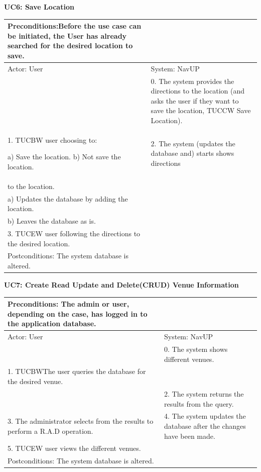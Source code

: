 \documentclass{article}
\begin{document}
		
        		\centering
					\textbf{UC6: Save Location}\\
       		 \small
       		 \begin{tabular}{|p{8cm}|p{8cm}|}
       		 \hline
       		 Preconditions:Before the use case can be initiated, the User has already searched for the desired location to save.& \\
       		 \hline
       		 Actor: User & System: NavUP \\
        		\hline
       		 & 0.	The system provides the directions to the location (and asks the user if they want to save the location, TUCCW Save Location).\\
       		 \hline
       		 1.	TUCBW user choosing to:

						a)	Save the location.
						b)	Not save the location.
 				& 2.	The system (updates the database and) starts shows directions \\to the location.

\\a) Updates the database by adding the location.
\\b) Leaves the database as is.
\\
        		\hline
       		 3.	TUCEW user following the directions to the desired location. &\\
       		 \hline
        		Postconditions: The system database is altered. \\
        		\hline
        \end{tabular} 
       

		
        		\centering
					\textbf{UC7: Create Read Update and Delete(CRUD) Venue Information}\\
       		 \small
       		 \begin{tabular}{|p{8cm}|p{8cm}|}
       		 \hline
       		 Preconditions: The admin or user, depending on the case, has logged in to the application database.& \\
       		 \hline
       		 Actor: User & System: NavUP \\
        		\hline
       		 & 0.	The system shows different venues.\\
       		 \hline
       		 1.	TUCBWThe user queries the database for the desired venue.\\
 				&2.	The system returns the results from the query.\\
        		\hline
       		 3.	The administrator selects from the results to perform a R.A.D operation. & 4.	The system updates the database after the changes have been made.\\
				\hline
					5.	TUCEW user views the different venues.&\\
       		 \hline
        		Postconditions: The system database is altered. \\
        		\hline
        \end{tabular} 
       
\end{document}
